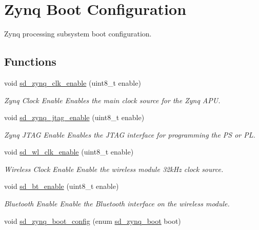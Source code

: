 \hypertarget{group___s_d___platform___boot___config}{}\section{Zynq Boot Configuration}
\label{group___s_d___platform___boot___config}


Zynq processing subsystem boot configuration.  


\subsection*{Functions}
\begin{DoxyCompactItemize}
\item 
void \mbox{\hyperlink{group___s_d___platform___boot___config_gad7a6663ba74657a3939e7a9701db0454}{sd\+\_\+zynq\+\_\+clk\+\_\+enable}} (uint8\+\_\+t enable)
\begin{DoxyCompactList}\small\item\em Zynq Clock Enable Enables the main clock source for the Zynq A\+PU. \end{DoxyCompactList}\item 
void \mbox{\hyperlink{group___s_d___platform___boot___config_ga527ae13356897e13098f309174444556}{sd\+\_\+zynq\+\_\+jtag\+\_\+enable}} (uint8\+\_\+t enable)
\begin{DoxyCompactList}\small\item\em Zynq J\+T\+AG Enable Enables the J\+T\+AG interface for programming the PS or PL. \end{DoxyCompactList}\item 
void \mbox{\hyperlink{group___s_d___platform___boot___config_ga5f6e21d454cec1f66957897103dafe85}{sd\+\_\+wl\+\_\+clk\+\_\+enable}} (uint8\+\_\+t enable)
\begin{DoxyCompactList}\small\item\em Wireless Clock Enable Enable the wireless module 32k\+Hz clock source. \end{DoxyCompactList}\item 
void \mbox{\hyperlink{group___s_d___platform___boot___config_ga0f06bff92025356b589e3cfdae8ddcb7}{sd\+\_\+bt\+\_\+enable}} (uint8\+\_\+t enable)
\begin{DoxyCompactList}\small\item\em Bluetooth Enable Enable the Bluetooth interface on the wireless module. \end{DoxyCompactList}\item 
void \mbox{\hyperlink{group___s_d___platform___boot___config_ga759f86160fc8d270309fc2a74e4139e3}{sd\+\_\+zynq\+\_\+boot\+\_\+config}} (enum \mbox{\hyperlink{group___s_d___platform_ga06667de95c86bfcdef8bcc8ab13cb2d4}{sd\+\_\+zynq\+\_\+boot}} boot)

\end{DoxyCompactItemize}
